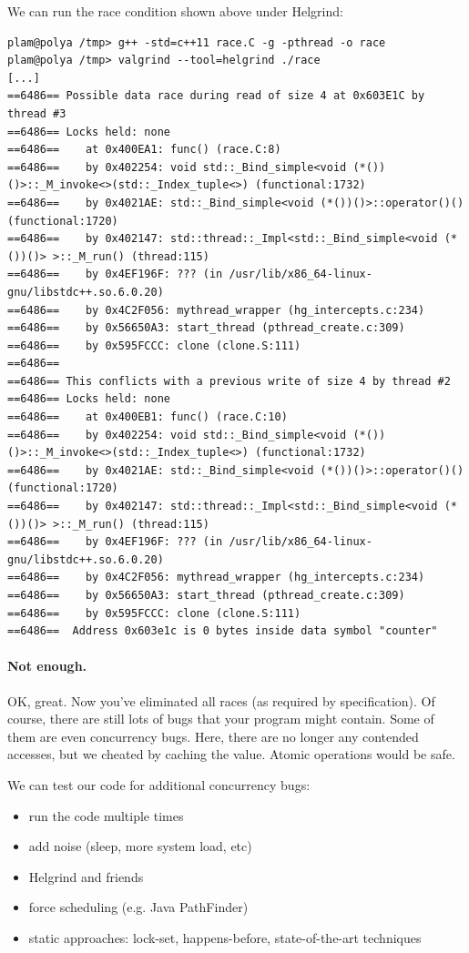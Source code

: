 \documentclass[11pt]{article}
\begin{document}
We can run the race condition shown above under Helgrind:
{\scriptsize
\begin{verbatim}
plam@polya /tmp> g++ -std=c++11 race.C -g -pthread -o race
plam@polya /tmp> valgrind --tool=helgrind ./race
[...]
==6486== Possible data race during read of size 4 at 0x603E1C by thread #3
==6486== Locks held: none
==6486==    at 0x400EA1: func() (race.C:8)
==6486==    by 0x402254: void std::_Bind_simple<void (*())()>::_M_invoke<>(std::_Index_tuple<>) (functional:1732)
==6486==    by 0x4021AE: std::_Bind_simple<void (*())()>::operator()() (functional:1720)
==6486==    by 0x402147: std::thread::_Impl<std::_Bind_simple<void (*())()> >::_M_run() (thread:115)
==6486==    by 0x4EF196F: ??? (in /usr/lib/x86_64-linux-gnu/libstdc++.so.6.0.20)
==6486==    by 0x4C2F056: mythread_wrapper (hg_intercepts.c:234)
==6486==    by 0x56650A3: start_thread (pthread_create.c:309)
==6486==    by 0x595FCCC: clone (clone.S:111)
==6486== 
==6486== This conflicts with a previous write of size 4 by thread #2
==6486== Locks held: none
==6486==    at 0x400EB1: func() (race.C:10)
==6486==    by 0x402254: void std::_Bind_simple<void (*())()>::_M_invoke<>(std::_Index_tuple<>) (functional:1732)
==6486==    by 0x4021AE: std::_Bind_simple<void (*())()>::operator()() (functional:1720)
==6486==    by 0x402147: std::thread::_Impl<std::_Bind_simple<void (*())()> >::_M_run() (thread:115)
==6486==    by 0x4EF196F: ??? (in /usr/lib/x86_64-linux-gnu/libstdc++.so.6.0.20)
==6486==    by 0x4C2F056: mythread_wrapper (hg_intercepts.c:234)
==6486==    by 0x56650A3: start_thread (pthread_create.c:309)
==6486==    by 0x595FCCC: clone (clone.S:111)
==6486==  Address 0x603e1c is 0 bytes inside data symbol "counter"
\end{verbatim}
}

\paragraph{Not enough.} OK, great. Now you've eliminated all races (as required by specification).
Of course, there are still lots of bugs that your program might contain. Some of them are even concurrency bugs.
Here, there are no longer any contended accesses, but we cheated by caching the value. Atomic operations would
be safe.



We can test our code for additional concurrency bugs:
    \begin{itemize}
    \item run the code multiple times
    \item add noise (sleep, more system load, etc)
    \item Helgrind and friends
    \item force scheduling (e.g. Java PathFinder)
    \item static approaches: lock-set, happens-before, state-of-the-art techniques
    \end{itemize}
\end{document}
